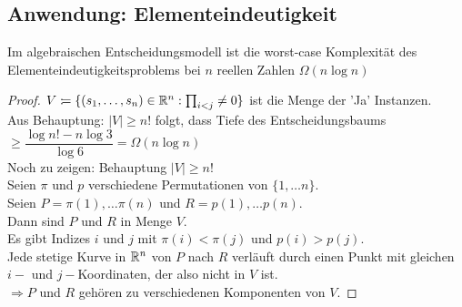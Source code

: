 \subsection{Anwendung: Elementeindeutigkeit}
\begin{satz}
Im algebraischen Entscheidungsmodell ist die worst-case Komplexität des Elementeindeutigkeitsproblems bei $n$ reellen Zahlen $\Omega(n\log n)$
\end{satz}
\begin{proof}
$V :\!= \{(s_1,\ldots,s_n) \in \mathbb{R}^n : \prod_{i < j} \ne 0 \}$ ist die Menge der 'Ja' Instanzen.\\
Aus Behauptung: $\lvert V \rvert \geq n!$ folgt, dass Tiefe des Entscheidungsbaums $\geq \dfrac{\log n! - n \log 3}{\log 6} = \Omega(n \log n)$\\
Noch zu zeigen: Behauptung $\lvert V \rvert \geq n!$\\
Seien $\pi$ und $p$ verschiedene Permutationen von $\{1,\ldots n \}.$\\
Seien $P = \pi(1),\ldots \pi(n)$ und $R = p(1), \ldots p(n)$.\\
Dann sind $P$ und $R$ in Menge $V$.\\
Es gibt Indizes $i$ und $j$ mit $\pi(i) < \pi(j)$ und $p(i) > p(j)$.\\
Jede stetige Kurve in $\mathbb{R}^n$ von $P$ nach $R$ verläuft durch einen Punkt mit gleichen $i-$ und $j-$Koordinaten, der also nicht in $V$ ist.\\
$\Rightarrow P$ und $R$ gehören zu verschiedenen Komponenten von $V$.
\end{proof}